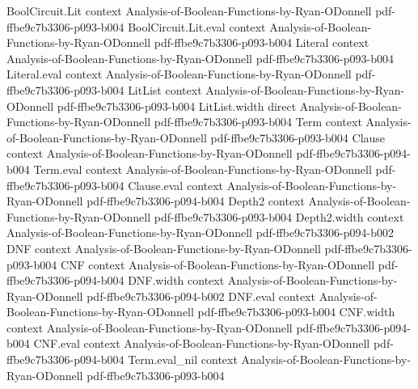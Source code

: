 \begin{lemma}
\leanok
{}
\proofstep
  {BoolCircuit.Lit}
  {context}
  {Analysis-of-Boolean-Functions-by-Ryan-ODonnell}
  {pdf-ffbe9c7b3306-p093-b004}
\proofstep
  {BoolCircuit.Lit.eval}
  {context}
  {Analysis-of-Boolean-Functions-by-Ryan-ODonnell}
  {pdf-ffbe9c7b3306-p093-b004}
\proofstep
  {Literal}
  {context}
  {Analysis-of-Boolean-Functions-by-Ryan-ODonnell}
  {pdf-ffbe9c7b3306-p093-b004}
\proofstep
  {Literal.eval}
  {context}
  {Analysis-of-Boolean-Functions-by-Ryan-ODonnell}
  {pdf-ffbe9c7b3306-p093-b004}
\proofstep
  {LitList}
  {context}
  {Analysis-of-Boolean-Functions-by-Ryan-ODonnell}
  {pdf-ffbe9c7b3306-p093-b004}
\proofstep
  {LitList.width}
  {direct}
  {Analysis-of-Boolean-Functions-by-Ryan-ODonnell}
  {pdf-ffbe9c7b3306-p093-b004}
\proofstep
  {Term}
  {context}
  {Analysis-of-Boolean-Functions-by-Ryan-ODonnell}
  {pdf-ffbe9c7b3306-p093-b004}
\proofstep
  {Clause}
  {context}
  {Analysis-of-Boolean-Functions-by-Ryan-ODonnell}
  {pdf-ffbe9c7b3306-p094-b004}
\proofstep
  {Term.eval}
  {context}
  {Analysis-of-Boolean-Functions-by-Ryan-ODonnell}
  {pdf-ffbe9c7b3306-p093-b004}
\proofstep
  {Clause.eval}
  {context}
  {Analysis-of-Boolean-Functions-by-Ryan-ODonnell}
  {pdf-ffbe9c7b3306-p094-b004}
\proofstep
  {Depth2}
  {context}
  {Analysis-of-Boolean-Functions-by-Ryan-ODonnell}
  {pdf-ffbe9c7b3306-p093-b004}
\proofstep
  {Depth2.width}
  {context}
  {Analysis-of-Boolean-Functions-by-Ryan-ODonnell}
  {pdf-ffbe9c7b3306-p094-b002}
\proofstep
  {DNF}
  {context}
  {Analysis-of-Boolean-Functions-by-Ryan-ODonnell}
  {pdf-ffbe9c7b3306-p093-b004}
\proofstep
  {CNF}
  {context}
  {Analysis-of-Boolean-Functions-by-Ryan-ODonnell}
  {pdf-ffbe9c7b3306-p094-b004}
\proofstep
  {DNF.width}
  {context}
  {Analysis-of-Boolean-Functions-by-Ryan-ODonnell}
  {pdf-ffbe9c7b3306-p094-b002}
\proofstep
  {DNF.eval}
  {context}
  {Analysis-of-Boolean-Functions-by-Ryan-ODonnell}
  {pdf-ffbe9c7b3306-p093-b004}
\proofstep
  {CNF.width}
  {context}
  {Analysis-of-Boolean-Functions-by-Ryan-ODonnell}
  {pdf-ffbe9c7b3306-p094-b004}
\proofstep
  {CNF.eval}
  {context}
  {Analysis-of-Boolean-Functions-by-Ryan-ODonnell}
  {pdf-ffbe9c7b3306-p094-b004}
\proofstep
  {Term.eval_nil}
  {context}
  {Analysis-of-Boolean-Functions-by-Ryan-ODonnell}
  {pdf-ffbe9c7b3306-p093-b004}

\end{lemma}
